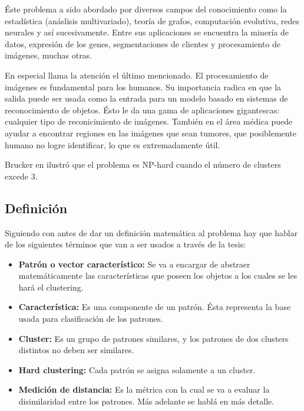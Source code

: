 \'Este problema a sido abordado por diversos campos del conocimiento como la estad\'istica
(an\'aslisis multivariado), teor\'ia de grafos, computaci\'on evolutiva, redes neurales y
as\'i sucesivamente\cite{SwAjAm2009}. Entre sus aplicaciones se encuentra la miner\'ia de datos, expresi\'on de los genes, 
segmentaciones de clientes y procesamiento de im\'agenes, muchas otras. \cite{GaChJi2007}

En especial llama la atenci\'on el \'ultimo mencionado. El procesamiento de im\'agenes es fundamental para los
humanos. Su importancia radica en que la salida puede ser usada como la entrada para 
un modelo basado en sistemas de reconocimiento de objetos.
\'Esto le da una gama de aplicaciones gigantescas: cualquier tipo de reconicimiento de im\'agenes.
Tambi\'en en el \'area m\'edica puede ayudar a encontrar regiones en las im\'agenes que sean tumores,
que posiblemente humano no logre identificar, lo que es extremadamente
\'util.

Brucker en \cite{Br1978} ilustr\'o que el problema es NP-hard cuando el n\'umero 
de clusters excede 3.

\subsection{Definici\'on} \label{sect:dclustdef}

Siguiendo con \cite{SwAjAm2009} antes de dar un definici\'on matem\'atica al problema hay que hablar de 
los siguientes t\'erminos que van a ser usados a trav\'es de la tesis:

\begin{itemize}

\item {\bf Patr\'on o vector caracter\'istico:} Se va a encargar de abstraer matem\'aticamente las
caracter\'isticas que poseen los objetos a los cuales se les har\'a el clustering.

\item {\bf Caracter\'istica:} Es una componente de un patr\'on. \'Esta representa
la base usada para clasificaci\'on de los patrones.

\item {\bf Cluster:} Es un grupo de patrones similares, y los patrones de dos clusters 
distintos no deben ser similares.

\item {\bf Hard clustering:} Cada patr\'on se asigna solamente a un cluster.

\item {\bf Medici\'on de distancia:} Es la m\'etrica con la cual se va a evaluar
la disimilaridad entre los patrones. M\'as adelante se habl\'a en m\'as detalle.

\end{itemize}


